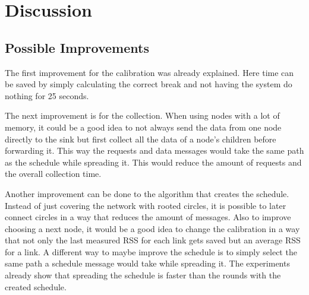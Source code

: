\chapter{Discussion}



\section{Possible Improvements}
The first improvement for the calibration was already explained. Here time can be saved by simply calculating the correct break and not having the system do nothing for 25 seconds.

The next improvement is for the collection. When using nodes with a lot of memory, it could be a good idea to not always send the data from one node directly to the sink but first collect all the data of a node's children before forwarding it. This way the requests and data messages would take the same path as the schedule while spreading it. This would reduce the amount of requests and the overall collection time.
 
Another improvement can be done to the algorithm that creates the schedule. Instead of just covering the network with rooted circles, it is possible to later connect circles in a way that reduces the amount of messages. Also to improve choosing a next node, it would be a good idea to change the calibration in a way that not only the last measured RSS for each link gets saved but an average RSS for a link.
A different way to maybe improve the schedule is to simply select the same path a schedule message would take while spreading it. The experiments already show that spreading the schedule is faster than the rounds with the created schedule. 

